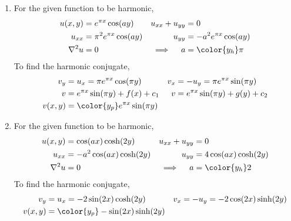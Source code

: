 \begin{enumerate}
    \item For the given function to be harmonic,
          \begin{align}
              u(x, y)          & = e^{\pi x} \cos(ay)       &
              u_{xx} + u_{yy}  & = 0                          \\
              u_{xx}           & = \pi^2 e^{\pi x} \cos(ay) &
              u_{yy}           & = -a^2 e^{\pi x} \cos(ay)    \\
              \nabla^2 u       & = 0                        &
              \implies \quad a & = \color{y_h} \pi
          \end{align}
          To find the harmonic conjugate,
          \begin{align}
              v_y     & = u_x = \pi e^{\pi x}\cos(\pi y)     &
              v_x     & = -u_y = \pi e^{\pi x}\sin(\pi y)      \\
              v       & = e^{\pi x} \sin(\pi y) + f(x) + c_1 &
              v       & = e^{\pi x} \sin(\pi y) + g(y) + c_2   \\
              v(x, y) & = \color{y_p} e^{\pi x} \sin(\pi y)
          \end{align}

    \item For the given function to be harmonic,
          \begin{align}
              u(x, y)          & = \cos(ax) \cosh(2y)     &
              u_{xx} + u_{yy}  & = 0                        \\
              u_{xx}           & = -a^2\cos(ax) \cosh(2y) &
              u_{yy}           & = 4\cos(ax) \cosh(2y)      \\
              \nabla^2 u       & = 0                      &
              \implies \quad a & = \color{y_h} 2
          \end{align}
          To find the harmonic conjugate,
          \begin{align}
              v_y     & = u_x = -2\sin(2x)\cosh(2y)      &
              v_x     & = -u_y = -2\cos(2x)\sinh(2y)       \\
              v(x, y) & = \color{y_p} -\sin(2x)\sinh(2y)
          \end{align}


\end{enumerate}
